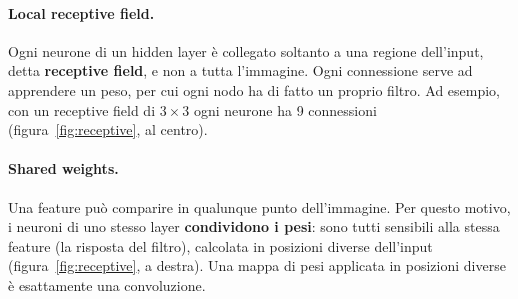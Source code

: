 \paragraph{Local receptive field.}
Ogni neurone di un hidden layer è collegato soltanto a una regione dell'input, detta \textbf{receptive field}, e non a tutta l'immagine. Ogni connessione serve ad apprendere un peso, per cui ogni nodo ha di fatto un proprio filtro. Ad esempio, con un receptive field di $3 \times 3$ ogni neurone ha 9 connessioni (figura~\ref{fig:receptive}, al centro).

\paragraph{Shared weights.}
Una feature può comparire in qualunque punto dell'immagine. Per questo motivo, i neuroni di uno stesso layer \textbf{condividono i pesi}: sono tutti sensibili alla stessa feature (la risposta del filtro), calcolata in posizioni diverse dell'input (figura~\ref{fig:receptive}, a destra). Una mappa di pesi applicata in posizioni diverse è esattamente una convoluzione.

